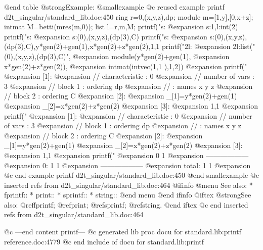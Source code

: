 {{{{{{@end table
@strong{Example:}
@smallexample
@c reused example printf d2t_singular/standard_lib.doc:450 
  ring r=0,(x,y,z),dp;
module m=[1,y],[0,x+z];
intmat M=betti(mres(m,0));
list l=r,m,M;
printf("s:%
@expansion{} s:1,l:int(2)
printf("s:%
@expansion{} s:(0),(x,y,z),(dp(3),C)
printf("s:%
@expansion{} s:(0),(x,y,z),(dp(3),C),y*gen(2)+gen(1),x*gen(2)+z*gen(2),1,1 
printf("2l:%
@expansion{} 2l:list("(0),(x,y,z),(dp(3),C)",
@expansion{} module(y*gen(2)+gen(1),
@expansion{} x*gen(2)+z*gen(2)),
@expansion{} intmat(intvec(1,1 ),1,2))
@expansion{} 
printf("%
@expansion{} [1]:
@expansion{}    //   characteristic : 0
@expansion{} //   number of vars : 3
@expansion{} //        block   1 : ordering dp
@expansion{} //                  : names    x y z 
@expansion{} //        block   2 : ordering C
@expansion{} [2]:
@expansion{}    _[1]=y*gen(2)+gen(1)
@expansion{}    _[2]=x*gen(2)+z*gen(2)
@expansion{} [3]:
@expansion{}    1,1 
@expansion{} 
printf("%
@expansion{} [1]:
@expansion{}    //   characteristic : 0
@expansion{} //   number of vars : 3
@expansion{} //        block   1 : ordering dp
@expansion{} //                  : names    x y z 
@expansion{} //        block   2 : ordering C
@expansion{} [2]:
@expansion{}    _[1]=y*gen(2)+gen(1)
@expansion{}    _[2]=x*gen(2)+z*gen(2)
@expansion{} [3]:
@expansion{}    1,1 
@expansion{} 
printf("%
@expansion{}            0     1
@expansion{} ------------------
@expansion{}     0:     1     1
@expansion{} ------------------
@expansion{} total:     1     1
@expansion{} 
@c end example printf d2t_singular/standard_lib.doc:450
@end smallexample
@c inserted refs from d2t_singular/standard_lib.doc:464
@ifinfo
@menu
See also:
* fprintf::
* print::
* sprintf::
* string::
@end menu
@end ifinfo
@iftex
@strong{See also:}
@ref{fprintf};
@ref{print};
@ref{sprintf};
@ref{string}.
@end iftex
@c end inserted refs from d2t_singular/standard_lib.doc:464

@c ---end content printf---
@c generated lib proc docu for standard.lib:printf reference.doc:4779 
@c end include of docu for standard.lib:printf

}}}}}}
